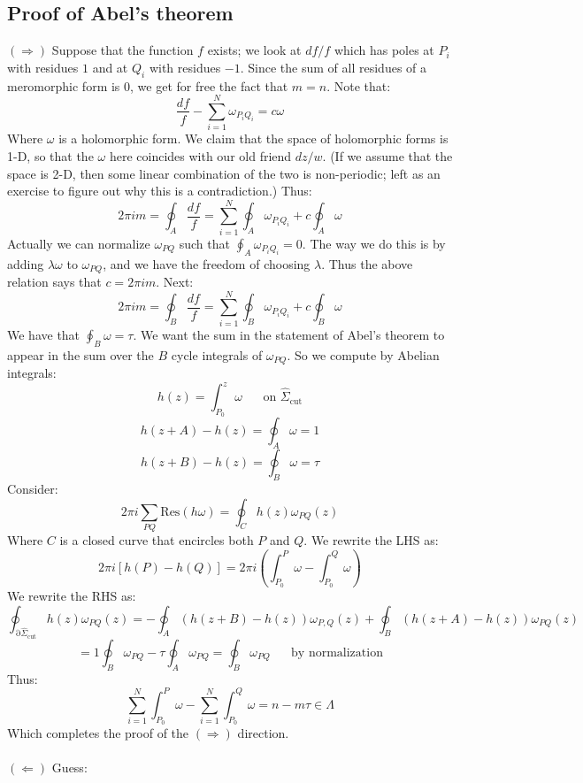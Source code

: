 \documentclass[12 pt]{article}
\DeclareMathOperator {\p} {\partial}
\theoremstyle{plain}
\theoremstyle{definition}
\theoremstyle{remark}
\begin{document}
\subsection*{Proof of Abel's theorem}
$(\Rightarrow)$ Suppose that the function $f$ exists; we look at $df/f$ which has poles at $P_i$ with residues $1$ and at $Q_i$ with residues $-1$. Since the sum of all residues of a meromorphic form is $0$, we get for free the fact that $m=n$. Note that:
\[      \frac{df}{f} - \sum_{i=1}^N \omega_{P_i Q_i}  = c \omega   \]
Where $\omega$ is a holomorphic form. We claim that the space of holomorphic forms is 1-D, so that the $\omega$ here coincides with our old friend $dz/w$. (If we assume that the space is 2-D, then some linear combination of the two is non-periodic; left as an exercise to figure out why this is a contradiction.) Thus:
\[      2\pi i m = \oint_A \frac{df}{f} = \sum_{i=1}^N \oint_A \omega_{P_i Q_i}  + c\oint_A \omega      \]
Actually we can normalize $\omega_{PQ}$ such that $\oint_A \omega_{P_i Q_i} = 0$. The way we do this is by adding $\lambda \omega$ to $\omega_{PQ}$, and we have the freedom of choosing $\lambda$. Thus the above relation says that $c = 2\pi i m$. Next:
\[       2\pi i m = \oint_B \frac{df}{f} = \sum_{i=1}^N \oint_B \omega_{P_i Q_i}  + c\oint_B \omega        \]
We have that $\oint_B \omega = \tau$. We want the sum in the statement of Abel's theorem to appear in the sum over the $B$ cycle integrals of $\omega_{PQ}$. So we compute by Abelian integrals:
\[      h(z) = \int_{P_0}^z \omega  \;\;\;\;\;\; \text{on } \hat \Sigma_{\text{cut}}     \]
\[       h(z+A) - h(z) =   \oint_A \omega = 1   \]
\[       h(z+B) - h(z) =   \oint_B \omega = \tau   \]
Consider:
\[         2\pi i \sum_{PQ} \text{Res} (h\omega) = \oint_C h(z) \omega_{PQ} (z)        \]
Where $C$ is a closed curve that encircles both $P$ and $Q$. We rewrite the LHS as:
\[         2\pi i [ h(P) - h(Q) ] = 2\pi i \left( \int_{P_0}^P \omega - \int_{P_0}^Q \omega  \right)     \]
We rewrite the RHS as:
\[       \oint_{\p \hat \Sigma_{\text{cut}}} h(z) \omega_{PQ} (z) =   - \oint_A \left( h(z+B) - h(z)  \right) \omega_{P,Q} (z) + \oint_B \left(  h(z+A) - h(z) \right)  \omega_{PQ} (z) \]
\[  = 1 \oint_B \omega_{PQ} - \tau \oint_A \omega_{PQ}  = \oint_B \omega_{PQ}  \;\;\;\;\;\; \text{by normalization} \]
Thus:
\[      \sum_{i=1}^N \int_{P_0}^P \omega -  \sum_{i=1}^N \int_{P_0}^Q \omega  = n - m\tau \in \Lambda \]
Which completes the proof of the $(\Rightarrow)$ direction.
\\
\\
$(\Leftarrow)$ Guess:
\end{document}
